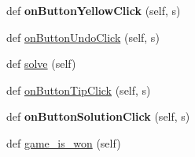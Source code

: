 \begin{DoxyCompactItemize}
def {\bfseries on\+Button\+Yellow\+Click} (self, s)
\item 
def \hyperlink{classmain_1_1MainWindow_a2acd695c824c327fa90308bc2ee511f3}{on\+Button\+Undo\+Click} (self, s)
\item 
def \hyperlink{classmain_1_1MainWindow_a5d1cca4f479efac16adbe9c980368bb3}{solve} (self)
\item 
def \hyperlink{classmain_1_1MainWindow_a26dc40b9b5d9e0327b0f593850746448}{on\+Button\+Tip\+Click} (self, s)
\item 
\mbox{\label{classmain_1_1MainWindow_a343f56df8e91b284ad76c72a1b132e7c}} 
def {\bfseries on\+Button\+Solution\+Click} (self, s)
\item 
def \hyperlink{classmain_1_1MainWindow_aa3f0bb9335d7040e1b09e1bd4c9352b8}{game\+\_\+is\+\_\+won} (self)
\end{DoxyCompactItemize}
